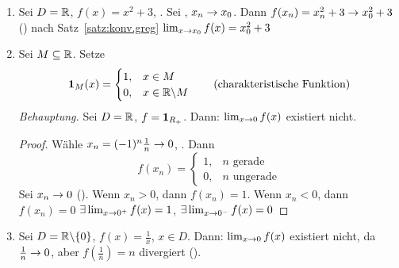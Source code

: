 \documentclass[12pt]{scrreprt}
\begin{document}
\begin{bsp}\label{bsp:fnkt.grenzw-fnkt}
\begin{enumerate}
\item Sei $D = \mathbb{R}$, $f(x) = x^2 +3$, . Sei , $x_n \rightarrow x_0$. Dann $f(x_n) = x_n^2 + 3 \rightarrow x_0^2 + 3$
(\ninf) nach Satz~\ref{satz:konv.greg} \folgt $\lim_{x\rightarrow x_0} f(x) = x_0^2 + 3$
\item Sei $M \subseteq \mathbb{R}$. Setze \[\mathbf{1}_{M}(x) = 
\begin{cases}
1, & x\in M\\
0, & x\in \mathbb{R}\backslash M
\end{cases} \tag{charakteristische Funktion}\]
\emph{Behauptung.} Sei $D=\mathbb{R}$, $f=\mathbf{1}_{R_+}$. Dann: $\lim_{x\rightarrow 0} f(x)$ existiert nicht.
\begin{proof} Wähle $x_n = (-1)^n\frac{1}{n} \rightarrow 0$, \ninf. Dann \[f(x_n) = \begin{cases}
1, &n\text{ gerade}\\
0, &n\text{ ungerade}\end{cases}\]
Sei $x_n\rightarrow 0$ (\ninf). Wenn $x_n > 0$, dann $f(x_n)=1$. Wenn $x_n < 0$, dann $f(x_n)=0$ \folgt 
$\exists\lim_{x\rightarrow 0^+} f(x) = 1$, $\exists\lim_{x\rightarrow 0^-} f(x) = 0$
\end{proof}
\item Sei $D = \mathbb{R}\backslash\{0\}$, $f(x) = \frac{1}{x}$, $x\in D$. Dann: $\lim_{x\rightarrow 0} f(x)$ existiert nicht, 
da $\frac{1}{n} \rightarrow 0$, aber $f(\frac{1}{n}) = n$ divergiert (\ninf).
\end{enumerate}
\end{bsp}
\end{document}
